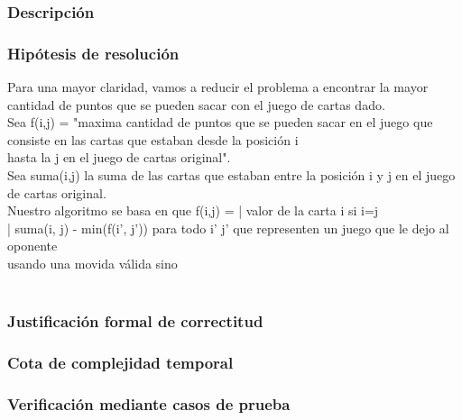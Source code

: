\documentclass[11pt, a4paper, twoside]{article}
\begin{document}
{}

\subsubsection{Descripción} 

\subsubsection{Hipótesis de resolución}
Para una mayor claridad, vamos a reducir el problema a encontrar la mayor cantidad de puntos que se pueden sacar con el juego de cartas dado.\\
Sea f(i,j) = "maxima cantidad de puntos que se pueden sacar en el juego que consiste en las cartas que estaban desde la posición i \\
hasta la j en el juego de cartas original".\\
Sea suma(i,j) la suma de las cartas que estaban entre la posición i y j en el juego de cartas original.\\
Nuestro algoritmo se basa en que f(i,j) =   | valor de la carta i      si i=j\\
                                            | suma(i, j) - min(f(i', j')) para todo i' j' que representen un juego que le dejo al oponente\\
                                              usando una movida válida        sino\\
\\





\subsubsection{Justificación formal de correctitud}

\subsubsection{Cota de complejidad temporal}

\subsubsection{Verificación mediante casos de prueba}
\end{document}
